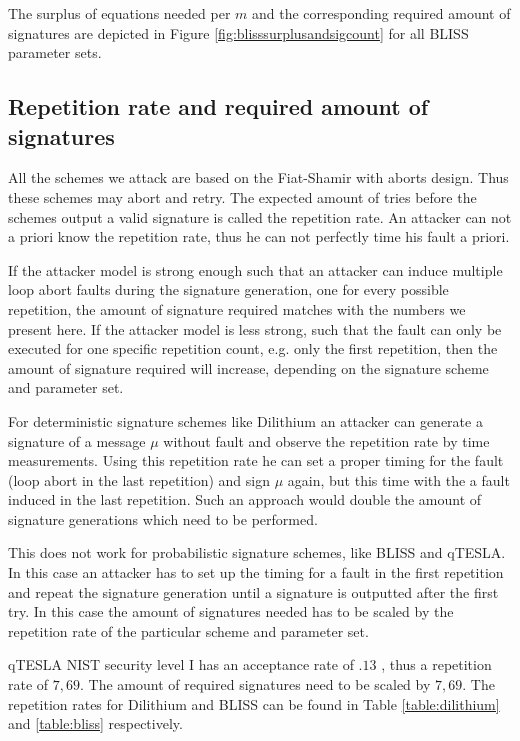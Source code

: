 The surplus of equations needed per $m$ and the corresponding required amount of signatures are depicted in Figure \ref{fig:blisssurplusandsigcount} for all BLISS parameter sets.



\subsection{Repetition rate and required amount of signatures}


All the schemes we attack are based on the Fiat-Shamir with aborts design. Thus these schemes may abort and retry. The expected amount of tries before the schemes output a valid signature is called the repetition rate. An attacker can not a priori know the repetition rate, thus he can not perfectly time his fault a priori. 

If the attacker model is strong enough such that an attacker can induce multiple loop abort faults during the signature generation, one for every possible repetition, the amount of signature required matches with the numbers we present here. If the attacker model is less strong, such that the fault can only be executed for one specific repetition count, e.g. only the first repetition, then the amount of signature required will increase, depending on the signature scheme and parameter set.

For deterministic signature schemes like Dilithium an attacker can generate a signature of a message $μ$ without fault and observe the repetition rate by time measurements. Using this repetition rate he can set a proper timing for the fault (loop abort in the last repetition) and sign $μ$ again, but this time with the a fault induced in the last repetition. Such an approach would double the amount of signature generations which need to be performed.

This does not work for probabilistic signature schemes, like BLISS and qTESLA. In this case an attacker has to set up the timing for a fault in the first repetition and repeat the signature generation until a signature is outputted after the first try. In this case the amount of signatures needed has to be scaled by the repetition rate of the particular scheme and parameter set.

qTESLA NIST security level I has an acceptance rate of $.13$ \cite[p.~452]{qtesla}, thus a repetition rate of  $7,69$. The amount of required signatures need to be scaled by $7,69$.
The repetition rates for Dilithium and BLISS can be found in Table \ref{table:dilithium} and \ref{table:bliss} respectively.

